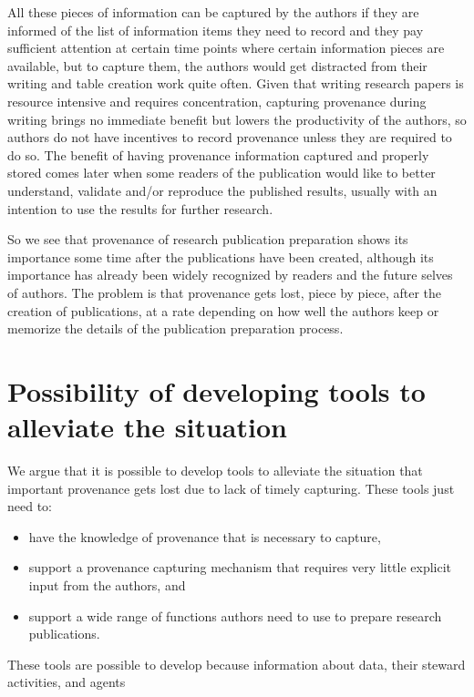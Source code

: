 All these pieces of information can be captured by the authors if they are informed of the list of information items they need to record and they pay sufficient attention at certain time points where certain information pieces are available, but to capture them, the authors would get distracted from their writing and table creation work quite often. Given that writing research papers is resource intensive and requires concentration, capturing provenance during writing brings no immediate benefit but lowers the productivity of the authors, so authors do not have incentives to record provenance unless they are required to do so. The benefit of having provenance information captured and properly stored comes later when some readers of the publication would like to better understand, validate and/or reproduce the published results, usually with an intention to use the results for further research.

So we see that provenance of research publication preparation shows its importance some time after the publications have been created, although its importance has already been widely recognized by readers and the future selves of authors. The problem is that provenance gets lost, piece by piece, after the creation of publications, at a rate depending on how well the authors keep or memorize the details of the publication preparation process.

\section{Possibility of developing tools to alleviate the situation}
We argue that it is possible to develop tools to alleviate the situation that important provenance gets lost due to lack of timely capturing. These tools just need to:
\begin{itemize}
\item have the knowledge of provenance that is necessary to capture,
\item support a provenance capturing mechanism that requires very little explicit input from the authors, and
\item support a wide range of functions authors need to use to prepare research publications.
\end{itemize}
These tools are possible to develop because information about data, their steward activities, and agents



